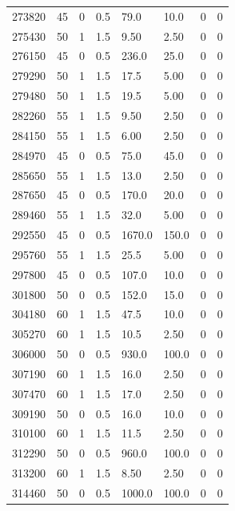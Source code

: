 \documentclass[preview]{standalone}
\begin{document}
{{{{{{{{{\begin{tabular}{L{1.2cm}C{1.2cm} C{0.3cm}C{0.5cm} C{1.4cm}C{1.4cm} C{1.4cm}C{1.4cm}}
  273820  &    45  & 0     & 0.5 &  79.0  & 10.0  & 0 &  0   \\ 
  275430  &    50  & 1     & 1.5 &  9.50  & 2.50  & 0 &  0   \\ 
  276150  &    45  & 0     & 0.5 &  236.0  & 25.0  & 0 &  0   \\ 
  279290  &    50  & 1     & 1.5 &  17.5  & 5.00  & 0 &  0   \\ 
  279480  &    50  & 1     & 1.5 &  19.5  & 5.00  & 0 &  0   \\ 
  282260  &    55  & 1     & 1.5 &  9.50  & 2.50  & 0 &  0   \\ 
  284150  &    55  & 1     & 1.5 &  6.00  & 2.50  & 0 &  0   \\ 
  284970  &    45  & 0     & 0.5 &  75.0  & 45.0  & 0 &  0   \\ 
  285650  &    55  & 1     & 1.5 &  13.0  & 2.50  & 0 &  0   \\ 
  287650  &    45  & 0     & 0.5 &  170.0  & 20.0  & 0 &  0   \\ 
  289460  &    55  & 1     & 1.5 &  32.0  & 5.00  & 0 &  0   \\ 
  292550  &    45  & 0     & 0.5 &  1670.0  & 150.0  & 0 &  0   \\ 
  295760  &    55  & 1     & 1.5 &  25.5  & 5.00  & 0 &  0   \\ 
  297800  &    45  & 0     & 0.5 &  107.0  & 10.0  & 0 &  0   \\ 
  301800  &    50  & 0     & 0.5 &  152.0  & 15.0  & 0 &  0   \\ 
  304180  &    60  & 1     & 1.5 &  47.5  & 10.0  & 0 &  0   \\ 
  305270  &    60  & 1     & 1.5 &  10.5  & 2.50  & 0 &  0   \\ 
  306000  &    50  & 0     & 0.5 &  930.0  & 100.0  & 0 &  0   \\ 
  307190  &    60  & 1     & 1.5 &  16.0  & 2.50  & 0 &  0   \\ 
  307470  &    60  & 1     & 1.5 &  17.0  & 2.50  & 0 &  0   \\ 
  309190  &    50  & 0     & 0.5 &  16.0  & 10.0  & 0 &  0   \\ 
  310100  &    60  & 1     & 1.5 &  11.5  & 2.50  & 0 &  0   \\ 
  312290  &    50  & 0     & 0.5 &  960.0  & 100.0  & 0 &  0   \\ 
  313200  &    60  & 1     & 1.5 &  8.50  & 2.50  & 0 &  0   \\ 
  314460  &    50  & 0     & 0.5 &  1000.0  & 100.0  & 0 &  0   \\ 
\hline 
\end{tabular} 

}}}}}}}}}
\end{document}
